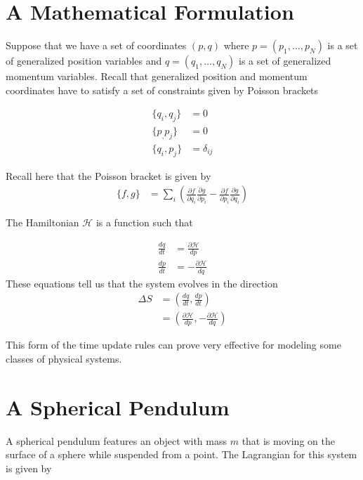 \documentclass[book.tex]{subfiles}
\begin{document}
\section{A Mathematical Formulation}

Suppose that we have a set of coordinates $(p, q)$ where $p=(p_1,\dotsc,p_N)$ is a set of generalized position variables and $q = (q_1, \dotsc, q_N)$ is a set of generalized momentum variables. Recall that generalized position and momentum coordinates have to satisfy a set of constraints given by Poisson brackets

\begin{align}
    \{q_i, q_j\} &= 0 \\
    \{p_, p_j\} &= 0 \\
    \{q_i, p_j\} &= \delta_{ij}
\end{align}

Recall here that the Poisson bracket is given by
\begin{align}
    \{f, g\} &= \sum_i \left ( \frac{\partial f}{\partial q_i} \frac{\partial g}{\partial p_i} - \frac{\partial f}{\partial p_i} \frac{\partial g}{\partial q_i} \right )
\end{align}

The Hamiltonian $\mathcal{H}$ is a function such that

\begin{align}
    \frac{dq}{dt} &= \frac{\partial \mathcal{H}}{d p} \\
    \frac{dp}{dt} &= -\frac{\partial \mathcal{H}}{d q}
\end{align}
These equations tell us that the system evolves in the direction
\begin{align}
    \Delta S &= (\frac{dq}{dt}, \frac{dp}{dt}) \\ 
    &= \left (\frac{\partial \mathcal{H}}{d p}, -\frac{\partial \mathcal{H}}{d q}\right )
\end{align}

This form of the time update rules can prove very effective for modeling some classes of physical systems.

\section{A Spherical Pendulum}

A spherical pendulum features an object with mass $m$ that is moving on the surface of a sphere while suspended from a point. The Lagrangian for this system is given by
\end{document}
